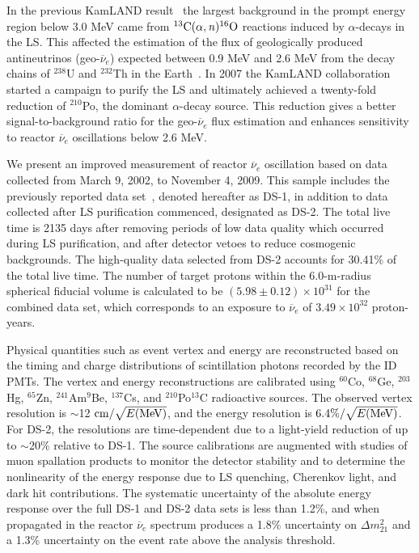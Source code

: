 \documentclass[aps,prc,twocolumn,groupedaddress,showpacs,amsmath,amssymb,floatfix,superscriptaddress]{revtex4}
\begin{document}
In the previous KamLAND result~\cite{Abe2008} the largest background in the prompt energy region below 3.0 MeV came from $^{13}{\rm C}(\alpha,{\it n})^{16}{\rm O}$ reactions induced by $\alpha$-decays in the LS.  This affected the estimation of the flux of geologically produced antineutrinos (geo-$\overline{\nu}_{e}$) expected between 0.9 MeV and 2.6 MeV from the decay chains of $^{238}$U and $^{232}$Th in the Earth~\cite{Araki2005b, Bellini2010}.  In 2007 the KamLAND collaboration started a campaign to purify the LS and ultimately achieved a twenty-fold reduction of $^{210}$Po, the dominant $\alpha$-decay source.  This reduction gives a better signal-to-background ratio for the geo-$\overline{\nu}_{e}$ flux estimation and enhances sensitivity to reactor $\overline{\nu}_{e}$ oscillations below 2.6 MeV.  

We present an improved measurement of reactor $\overline{\nu}_{e}$ oscillation based on data collected from March 9, 2002, to November 4, 2009.  This sample includes the previously reported data set~\cite{Abe2008}, denoted hereafter as \mbox{DS-1}, in addition to data collected after LS purification commenced, designated as \mbox{DS-2}.  The total live time is 2135 days after removing periods of low data quality which occurred during LS purification, and after detector vetoes to reduce cosmogenic backgrounds.  The high-quality data selected from \mbox{DS-2} accounts for 30.41\% of the total live time.  The number of target protons within the 6.0-m-radius spherical fiducial volume is calculated to be $(5.98 \pm 0.12) \times 10^{31}$ for the combined data set, which corresponds to an exposure to $\overline{\nu}_{e}$ of $3.49 \times 10^{32}$ proton-years. 

Physical quantities such as event vertex and energy are reconstructed based on the timing and charge distributions of scintillation photons recorded by the ID PMTs.  The vertex and energy reconstructions are calibrated using $^{60}$Co, $^{68}$Ge, $^{203}$Hg, $^{65}$Zn, $^{241}$Am$^{9}$Be, $^{137}$Cs, and $^{210}$Po$^{13}$C radioactive sources. The observed vertex resolution is $\sim$12 ${\rm cm}/\sqrt{E{\rm (MeV)}}$, and the energy resolution is $6.4\%/\sqrt{E{\rm (MeV)}}$. For \mbox{DS-2}, the resolutions are time-dependent due to a light-yield reduction of up to $\sim$20\% relative to \mbox{DS-1}. 
The source calibrations are augmented with studies of muon spallation products to monitor the detector stability and to determine the nonlinearity of the energy response due to LS quenching, Cherenkov light, and dark hit contributions.
The systematic uncertainty of the absolute energy response over the full \mbox{DS-1} and \mbox{DS-2} data sets is less than 1.2\%, and when propagated in the reactor $\overline{\nu}_{e}$ spectrum produces a 1.8\% uncertainty on $\Delta m^{2}_{21}$ and a 1.3\% uncertainty on the event rate above the analysis threshold.  
\end{document}
